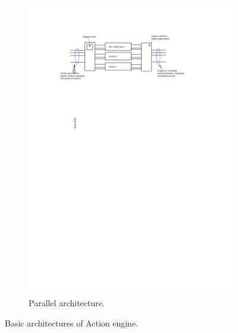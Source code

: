 \begin{figure}[t]
\begin{subfigure}[b]{0.85\textwidth}
        \includegraphics[width=\textwidth]{chapters/pic/action-engine-parallel}
        \caption{Parallel architecture.}
        \label{fig:actionParallel}
    \end{subfigure}
    
    \caption{Basic architectures of Action engine.}
    \label{fig:basicArchitectures}
\end{figure}

